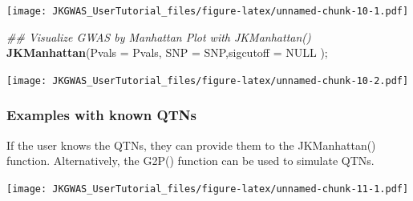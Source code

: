 \documentclass[
]{article}
\newenvironment{Shaded}{\begin{snugshade}}{\end{snugshade}}
\newcommand{\CommentTok}[1]{\textcolor[rgb]{0.56,0.35,0.01}{\textit{#1}}}
\newcommand{\DataTypeTok}[1]{\textcolor[rgb]{0.13,0.29,0.53}{#1}}
\newcommand{\DecValTok}[1]{\textcolor[rgb]{0.00,0.00,0.81}{#1}}
\newcommand{\FloatTok}[1]{\textcolor[rgb]{0.00,0.00,0.81}{#1}}
\newcommand{\KeywordTok}[1]{\textcolor[rgb]{0.13,0.29,0.53}{\textbf{#1}}}
\newcommand{\NormalTok}[1]{#1}
\newcommand{\OperatorTok}[1]{\textcolor[rgb]{0.81,0.36,0.00}{\textbf{#1}}}
\newcommand{\OtherTok}[1]{\textcolor[rgb]{0.56,0.35,0.01}{#1}}
\newcommand{\StringTok}[1]{\textcolor[rgb]{0.31,0.60,0.02}{#1}}
\begin{document}
\texttt{[image: JKGWAS\_UserTutorial\_files/figure-latex/unnamed-chunk-10-1.pdf]}

\begin{Shaded}
\begin{Highlighting}[]
\CommentTok{\#\# Visualize GWAS by Manhattan Plot with JKManhattan()}
\KeywordTok{JKManhattan}\NormalTok{(}\DataTypeTok{Pvals =}\NormalTok{ Pvals, }\DataTypeTok{SNP =}\NormalTok{ SNP,}\DataTypeTok{sigcutoff =} \OtherTok{NULL}\NormalTok{ );}
\end{Highlighting}
\end{Shaded}

\texttt{[image: JKGWAS\_UserTutorial\_files/figure-latex/unnamed-chunk-10-2.pdf]}

\hypertarget{examples-with-known-qtns}{%
\subsubsection{\texorpdfstring{\textbf{Examples with known
QTNs}}{Examples with known QTNs}}\label{examples-with-known-qtns}}

If the user knows the QTNs, they can provide them to the JKManhattan()
function. Alternatively, the G2P() function can be used to simulate
QTNs.

\begin{Shaded}
\end{Shaded}

\texttt{[image: JKGWAS\_UserTutorial\_files/figure-latex/unnamed-chunk-11-1.pdf]}

\begin{Shaded}
\end{Shaded}
\end{document}
